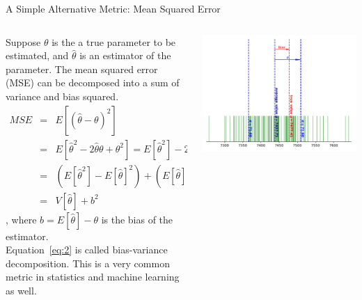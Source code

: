 \documentclass[aspectratio=169]{beamer}
\begin{document}
\begin{frame}{A Simple Alternative Metric: Mean Squared Error}
  \begin{columns}
    \begin{column}{.5\textwidth}
      \footnotesize
			Suppose $\theta$ is the a true parameter to be estimated, and $\hat{\theta}$ is an estimator of the parameter.
			The mean squared error (MSE) can be decomposed into a sum of variance and bias squared.
			\begin{eqnarray} \label{eq:2}
			MSE &=& E[(\hat{\theta}-\theta)^2]\nonumber\\
			&=& E[\hat{\theta}^2-2\hat{\theta}\theta+\theta^2] = E[\hat{\theta}^2] -2\theta E[\hat{\theta}]+\theta^2 \nonumber\\
			&=& (E[\hat{\theta}^2]-E[\hat{\theta}]^2)+(E[\hat{\theta}]^2-2\theta E[\hat{\theta}]+\theta^2) \nonumber\\
			&=& V[\hat{\theta}]+b^2
			\end{eqnarray}
			, where $b=E[\hat{\theta}]-\theta$ is the bias of the estimator.\\
			Equation~\ref{eq:2} is called bias-variance decomposition.
			\vfill
			This is a very common metric in statistics and machine learning as well.
	\end{column}
    \begin{column}{.5\textwidth}
      \includegraphics[width=\textwidth]{figures/mse_illustration_iter20.pdf}
    \end{column}
  \end{columns}
\end{frame}
\end{document}
